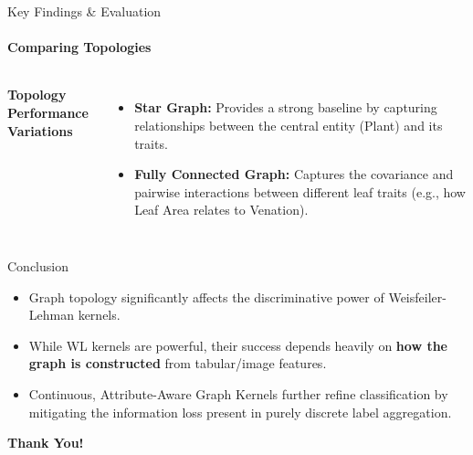 \documentclass[aspectratio=169, 11pt]{beamer}
\begin{document}
\begin{frame}{Key Findings \& Evaluation}
    \framesubtitle{Comparing Topologies}

    \begin{columns}[c]
        \textbf{Topology Performance Variations}
        \vspace{0.15cm}
        \begin{itemize}
            \item \textbf{Star Graph:} Provides a strong baseline by capturing relationships between the central entity (Plant) and its traits.
            \item \textbf{Fully Connected Graph:} Captures the covariance and pairwise interactions between different leaf traits (e.g., how Leaf Area relates to Venation).
        \end{itemize}
    \end{columns}
\end{frame}

\begin{frame}{Conclusion}
    \begin{itemize}
        \item Graph topology significantly affects the discriminative power of Weisfeiler-Lehman kernels.
        \item While WL kernels are powerful, their success depends heavily on \textbf{how the graph is constructed} from tabular/image features.
        \item Continuous, Attribute-Aware Graph Kernels further refine classification by mitigating the information loss present in purely discrete label aggregation.
    \end{itemize}
    \vspace{0.5cm}
    \begin{center}
        \Large \textbf{Thank You!}
    \end{center}
\end{frame}
\end{document}
